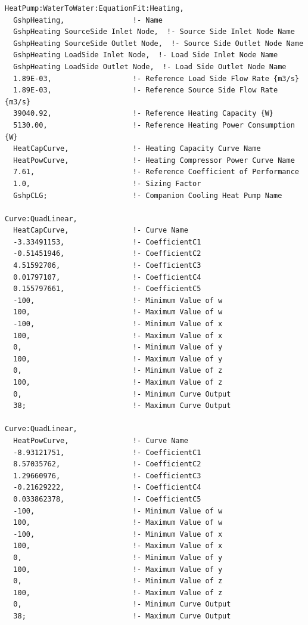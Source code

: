 \begin{lstlisting}
HeatPump:WaterToWater:EquationFit:Heating,
  GshpHeating,                !- Name
  GshpHeating SourceSide Inlet Node,  !- Source Side Inlet Node Name
  GshpHeating SourceSide Outlet Node,  !- Source Side Outlet Node Name
  GshpHeating LoadSide Inlet Node,  !- Load Side Inlet Node Name
  GshpHeating LoadSide Outlet Node,  !- Load Side Outlet Node Name
  1.89E-03,                   !- Reference Load Side Flow Rate {m3/s}
  1.89E-03,                   !- Reference Source Side Flow Rate {m3/s}
  39040.92,                   !- Reference Heating Capacity {W}
  5130.00,                    !- Reference Heating Power Consumption {W}
  HeatCapCurve,               !- Heating Capacity Curve Name
  HeatPowCurve,               !- Heating Compressor Power Curve Name
  7.61,                       !- Reference Coefficient of Performance
  1.0,                        !- Sizing Factor
  GshpCLG;                    !- Companion Cooling Heat Pump Name

Curve:QuadLinear,
  HeatCapCurve,               !- Curve Name
  -3.33491153,                !- CoefficientC1
  -0.51451946,                !- CoefficientC2
  4.51592706,                 !- CoefficientC3
  0.01797107,                 !- CoefficientC4
  0.155797661,                !- CoefficientC5
  -100,                       !- Minimum Value of w
  100,                        !- Maximum Value of w
  -100,                       !- Minimum Value of x
  100,                        !- Maximum Value of x
  0,                          !- Minimum Value of y
  100,                        !- Maximum Value of y
  0,                          !- Minimum Value of z
  100,                        !- Maximum Value of z
  0,                          !- Minimum Curve Output
  38;                         !- Maximum Curve Output

Curve:QuadLinear,
  HeatPowCurve,               !- Curve Name
  -8.93121751,                !- CoefficientC1
  8.57035762,                 !- CoefficientC2
  1.29660976,                 !- CoefficientC3
  -0.21629222,                !- CoefficientC4
  0.033862378,                !- CoefficientC5
  -100,                       !- Minimum Value of w
  100,                        !- Maximum Value of w
  -100,                       !- Minimum Value of x
  100,                        !- Maximum Value of x
  0,                          !- Minimum Value of y
  100,                        !- Maximum Value of y
  0,                          !- Minimum Value of z
  100,                        !- Maximum Value of z
  0,                          !- Minimum Curve Output
  38;                         !- Maximum Curve Output
\end{lstlisting}

